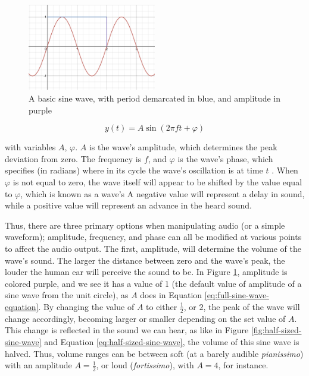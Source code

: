 \begin{figure}[h]
	\centering
	\includegraphics[width=0.5\textwidth]{figures/sine-wave-period-amplitude.png}
	\caption{A basic sine wave, with period demarcated in blue, and amplitude in purple}
	\label{fig:sine-wave-period-amplitude}
\end{figure}

\begin{equation}\label{eq:full-sine-wave-equation}
	y(t) = A \sin(2\pi ft + \varphi)
\end{equation}

with variables $A$, $\varphi$. $A$ is the wave's amplitude, which determines the peak deviation from zero. The frequency is $f$, and $\varphi$ is the wave's phase, which specifies (in radians) where in its cycle the wave's oscillation is at time $t$ \cite{Kirk_Hunt_2013}. When $\varphi$ is not equal to zero, the wave itself will appear to be shifted by the value equal to $\varphi$, which is known as a wave's  A negative value will represent a delay in sound, while a positive value will represent an advance in the heard sound.

Thus, there are three primary options when manipulating audio (or a simple waveform); amplitude, frequency, and phase can all be modified at various points to affect the audio output. The first, amplitude, will determine the volume of the wave's sound. The larger the distance between zero and the wave's peak, the louder the human ear will perceive the sound to be\cite{Zjalic_2021}. In Figure \ref{fig:sine-wave-period-amplitude}, amplitude is colored purple, and we see it has a value of 1 (the default value of amplitude of a sine wave from the unit circle), as $A$ does in Equation \ref{eq:full-sine-wave-equation}. By changing the value of $A$ to either $\frac{1}{2}$, or $2$, the peak of the wave will change accordingly, becoming larger or smaller depending on the set value of $A$. This change is reflected in the sound we can hear, as like in Figure \ref{fig:half-sized-sine-wave} and Equation \ref{eq:half-sized-sine-wave}, the volume of this sine wave is halved. Thus, volume ranges can be between soft (at a barely audible \textit{pianissimo}) with an amplitude $A = \frac{1}{2}$, or loud (\textit{fortissimo}), with $A = 4$, for instance.


